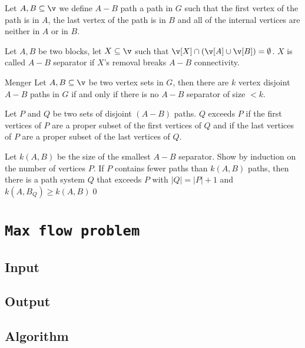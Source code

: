 \begin{definition}[$A - B$ path]
    Let $A, B \subseteq \v$ we define $A - B$ path a path in $G$ such that the first vertex of the path is in $A$, the last vertex of the path is in $B$ and all of the internal vertices are neither in $A$ or in $B$.    
\end{definition}
\begin{definition}[$A - B$ separator]
    Let $A, B$ be two blocks, let $X \subseteq \v$ such that $\v[X] \cap (\v[A] \cup \v[B]) = \emptyset$. $X$ is called $A - B$ separator if $X$'s  removal breaks $A - B$ connectivity.
\end{definition}
\begin{customtheorem}{Menger}
\label{theorem:menger}
    Let $A, B \subseteq \v$ be two vertex sets in $G$, then there are $k$ vertex disjoint $A - B$ paths in $G$ if and only if there is no $A - B$ separator of size $< k$.
\end{customtheorem}
\begin{prf}
    Let $P$ and $Q$ be two sets of disjoint $(A - B)$ paths. $Q$ exceeds $P$ if the first vertices of $P$ are a proper subset of the first vertices of $Q$ and if the last vertices of $P$ are a proper subset of the last vertices of $Q$.

    Let $k(A, B)$ be the size of the smallest $A - B$ separator. Show by induction on the number of vertices $P$. If $P$ contains fewer paths than $k(A, B)$ paths, then there is a path system $Q$ that exceeds $P$ with $|Q| = |P| + 1$ and $k(A, B_Q) \geq k(A, B)$\qed
\end{prf}
\section{\texttt{Max flow problem}}
\subsection{Input}
\subsection{Output}
\subsection{Algorithm}
